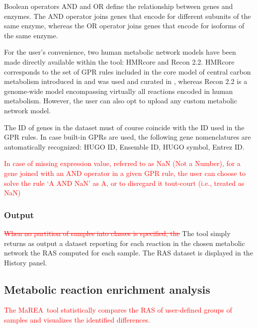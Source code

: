 \documentclass[preprint,12pt,authoryear]{elsarticle}
\newcommand{\red}{\textcolor{red}}
\newcommand{\mareaTool}{\textsf{MaREA}}
\begin{document}
Boolean operators AND and OR define the relationship between genes and
enzymes.
%
The AND operator joins genes that encode for different subunits of the
same enzyme, whereas the OR operator joins genes that encode for
isoforms of the same enzyme.

For the user's convenience, two human metabolic network models have
been made directly available within the tool: HMRcore and Recon
2.2. HMRcore corresponds to the set of GPR rules included in the core
model of central carbon metabolism introduced in \citep{DiFilippo2016}
and was used and curated in
\citep{popFBA,graudenzi2018fbaca,damiani2018integration,marea},
whereas Recon 2.2 \citep{swainston2016recon} is a genome-wide model
encompassing virtually all reactions encoded in human metabolism.
%
However, the user can also opt to upload any custom metabolic network
model.

The ID of genes in the dataset must of course coincide with the ID
used in the GPR rules. In case built-in GPRs are used, the following
gene nomenclatures are automatically recognized: HUGO ID, Ensemble ID,
HUGO symbol, Entrez ID.

\red{In case of missing expression value, referred to as NaN (Not a
  Number), for a gene joined with an AND operator in a given GPR rule,
  the user can choose to solve the rule `A AND NaN' as A, or to
  disregard it tout-court (i.e., treated as NaN)}


\subsubsection{Output}

\red{\sout{When no partition of samples into classes is specified,
    the}} The tool simply returns as output a dataset reporting for
each reaction in the chosen metabolic network the RAS computed for
each sample. The RAS dataset is displayed in the History panel.


\subsection{Metabolic reaction enrichment analysis}

\red{The \mareaTool\ tool statistically compares the RAS of
  user-defined groups of samples \citep{marea} and visualizes the
  identified differences.}
\end{document}
